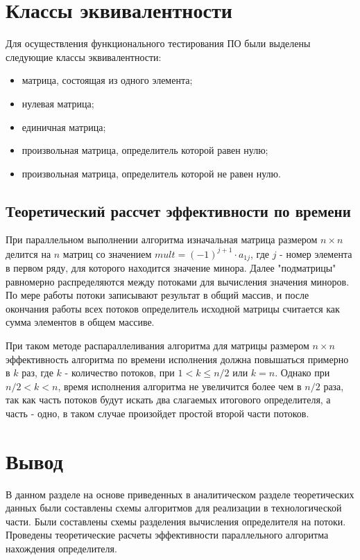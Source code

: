 \documentclass[12pt]{report}
\begin{document}
	\section{Классы эквивалентности}
	Для осуществления функционального тестирования ПО были выделены следующие классы эквивалентности:
	\begin{itemize}
		\item матрица, состоящая из одного элемента;
		\item нулевая матрица;
		\item единичная матрица;
		\item произвольная матрица, определитель которой равен нулю;
		\item произвольная матрица, определитель которой не равен нулю.
	\end{itemize}

    \subsection{Теоретический рассчет эффективности по времени}

    При параллельном выполнении алгоритма изначальная матрица размером $n \times n$ делится на $n$ матриц
    со значением $mult = (-1)^{j + 1} \cdot a_{1j}$,
    где $j$ - номер элемента в первом ряду, для которого находится значение минора.
    Далее "подматрицы" равномерно распределяются между потоками для вычисления значения миноров.
    По мере работы потоки записывают результат в общий массив, и после окончания работы всех потоков
    определитель исходной матрицы считается как сумма элементов в общем массиве.

    При таком методе распараллеливания алгоритма для матрицы размером $n \times n$ эффективность
    алгоритма по времени исполнения должна повышаться примерно в $k$ раз, где $k$ - количество потоков,
    при $1 < k \leq n / 2$ или $k = n$.
    Однако при $ n / 2 < k < n$, время исполнения алгоритма не увеличится более чем в $n / 2$ раза,
    так как часть потоков будут искать два слагаемых итогового определителя, а часть - одно,
    в таком случае произойдет простой второй части потоков.


    \section{Вывод}
    В данном разделе на основе приведенных в аналитическом разделе теоретических данных
    были составлены схемы алгоритмов для реализации в технологической части.
    Были составлены схемы разделения вычисления определителя на потоки.
    Проведены теоретические расчеты эффективности параллельного алгоритма нахождения определителя.
    \newpage
\end{document}
